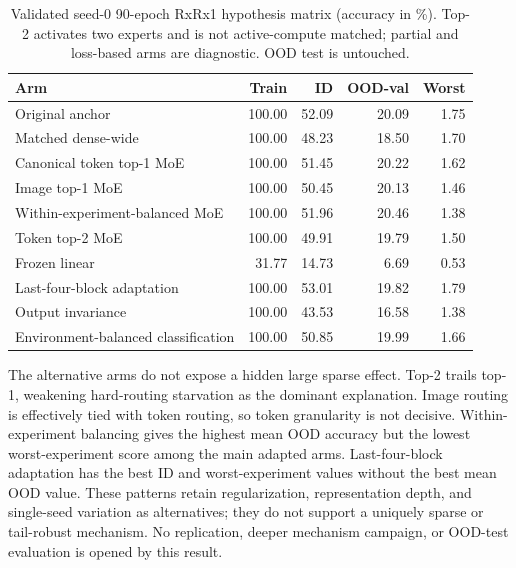 \begin{table}[t]
  \centering
  \caption{Validated seed-0 90-epoch RxRx1 hypothesis matrix (accuracy in \%). Top-2 activates
  two experts and is not active-compute matched; partial and loss-based arms are diagnostic. OOD
  test is untouched.}
  \label{tab:hypothesis90}
  \begin{tabular}{lrrrr}
    \toprule
    Arm & Train & ID & OOD-val & Worst \\
    \midrule
    Original anchor & 100.00 & 52.09 & 20.09 & 1.75 \\
    Matched dense-wide & 100.00 & 48.23 & 18.50 & 1.70 \\
    Canonical token top-1 MoE & 100.00 & 51.45 & 20.22 & 1.62 \\
    Image top-1 MoE & 100.00 & 50.45 & 20.13 & 1.46 \\
    Within-experiment-balanced MoE & 100.00 & 51.96 & 20.46 & 1.38 \\
    Token top-2 MoE & 100.00 & 49.91 & 19.79 & 1.50 \\
    Frozen linear & 31.77 & 14.73 & 6.69 & 0.53 \\
    Last-four-block adaptation & 100.00 & 53.01 & 19.82 & 1.79 \\
    Output invariance & 100.00 & 43.53 & 16.58 & 1.38 \\
    Environment-balanced classification & 100.00 & 50.85 & 19.99 & 1.66 \\
    \bottomrule
  \end{tabular}
\end{table}

The alternative arms do not expose a hidden large sparse effect. Top-2 trails top-1, weakening
hard-routing starvation as the dominant explanation. Image routing is effectively tied with token
routing, so token granularity is not decisive. Within-experiment balancing gives the highest mean
OOD accuracy but the lowest worst-experiment score among the main adapted arms. Last-four-block
adaptation has the best ID and worst-experiment values without the best mean OOD value. These
patterns retain regularization, representation depth, and single-seed variation as alternatives;
they do not support a uniquely sparse or tail-robust mechanism. No replication, deeper mechanism
campaign, or OOD-test evaluation is opened by this result.

